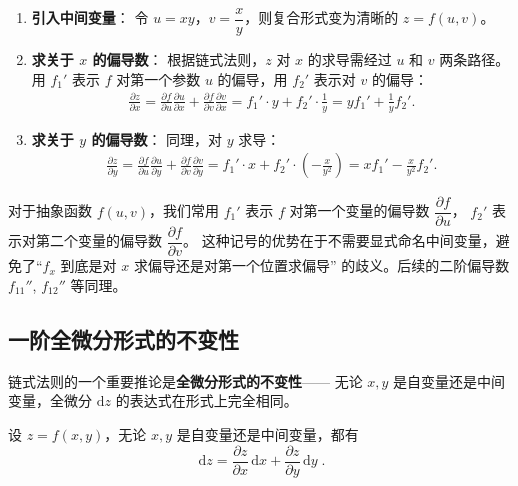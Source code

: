 \documentclass[lang=cn,11pt]{elegantbook}
\begin{document}
\begin{solution}
\begin{enumerate}
  \item \textbf{引入中间变量}：
  令 $u=xy$，$v=\dfrac{x}{y}$，则复合形式变为清晰的 $z=f(u,v)$。

  \item \textbf{求关于 $x$ 的偏导数}：
  根据链式法则，$z$ 对 $x$ 的求导需经过 $u$ 和 $v$ 两条路径。
  用 $f_1'$ 表示 $f$ 对第一个参数 $u$ 的偏导，用 $f_2'$ 表示对 $v$ 的偏导：
  \begin{align*}
  \frac{\partial z}{\partial x}=\frac{\partial f}{\partial u}\frac{\partial u}{\partial x}+\frac{\partial f}{\partial v}\frac{\partial v}{\partial x} =f_1'\cdot y+f_2'\cdot\frac{1}{y} =\boxed{yf_1'+\frac{1}{y}f_2'}.
  \end{align*}

  \item \textbf{求关于 $y$ 的偏导数}：
  同理，对 $y$ 求导：
  \begin{align*}
  \frac{\partial z}{\partial y}=\frac{\partial f}{\partial u}\frac{\partial u}{\partial y}
  +\frac{\partial f}{\partial v}\frac{\partial v}{\partial y} =f_1'\cdot x+f_2'\cdot\left(-\frac{x}{y^2}\right) =\boxed{xf_1'-\frac{x}{y^2}f_2'}.
  \end{align*}
\end{enumerate}
\end{solution}

\begin{note}[下标记号的约定]
对于抽象函数 $f(u,v)$，我们常用 $f_1'$ 表示 $f$ 对第一个变量的偏导数 $\dfrac{\partial f}{\partial u}$，
$f_2'$ 表示对第二个变量的偏导数 $\dfrac{\partial f}{\partial v}$。
这种记号的优势在于不需要显式命名中间变量，避免了“$f_x$ 到底是对 $x$ 求偏导还是对第一个位置求偏导”
的歧义。后续的二阶偏导数 $f_{11}''$, $f_{12}''$ 等同理。
\end{note}


\subsection{一阶全微分形式的不变性}

链式法则的一个重要推论是\textbf{全微分形式的不变性}——
无论 $x,y$ 是自变量还是中间变量，全微分 $\mathrm{d}z$ 的表达式在形式上完全相同。

\begin{theorem}[一阶全微分形式的不变性] \label{thm:diff-invariance}
设 $z=f(x,y)$，无论 $x,y$ 是自变量还是中间变量，都有
\[
\boxed{\;\mathrm{d}z=\frac{\partial z}{\partial x}\,\mathrm{d}x+\frac{\partial z}{\partial y}\,\mathrm{d}y\;}.
\]
\end{theorem}
\end{document}
